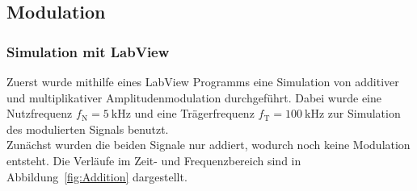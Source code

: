 \documentclass[a4paper,twoside,final]{article}
\begin{document}
\subsection{Modulation}
\subsubsection{Simulation mit LabView}
Zuerst wurde mithilfe eines LabView Programms eine Simulation von additiver und multiplikativer Amplitudenmodulation durchgeführt. Dabei wurde eine Nutzfrequenz $f_\text{N} = \SI{5}{\kilo\hertz}$ und eine Trägerfrequenz $f_\text{T} = \SI{100}{\kilo\hertz}$ zur Simulation des modulierten Signals benutzt.\\
Zunächst wurden die beiden Signale nur addiert, wodurch noch keine Modulation entsteht. Die Verläufe im Zeit- und Frequenzbereich sind in Abbildung~\ref{fig:Addition} dargestellt.
\end{document}
